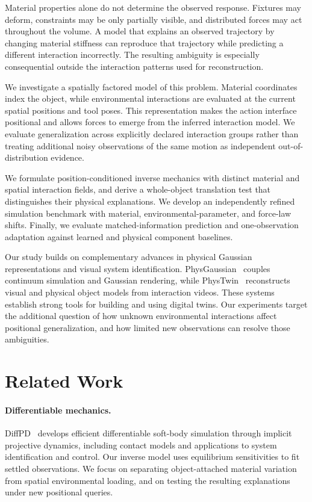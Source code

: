\documentclass[10pt,twocolumn,letterpaper]{article}
\begin{document}
Material properties alone do not determine the observed response. Fixtures may deform, constraints may be only partially visible, and distributed forces may act throughout the volume. A model that explains an observed trajectory by changing material stiffness can reproduce that trajectory while predicting a different interaction incorrectly. The resulting ambiguity is especially consequential outside the interaction patterns used for reconstruction.

We investigate a spatially factored model of this problem. Material coordinates index the object, while environmental interactions are evaluated at the current spatial positions and tool poses. This representation makes the action interface positional and allows forces to emerge from the inferred interaction model. We evaluate generalization across explicitly declared interaction groups rather than treating additional noisy observations of the same motion as independent out-of-distribution evidence.

We formulate position-conditioned inverse mechanics with distinct material and spatial interaction fields, and derive a whole-object translation test that distinguishes their physical explanations. We develop an independently refined simulation benchmark with material, environmental-parameter, and force-law shifts. Finally, we evaluate matched-information prediction and one-observation adaptation against learned and physical component baselines.

Our study builds on complementary advances in physical Gaussian representations and visual system identification. PhysGaussian~\cite{xie2024physgaussian} couples continuum simulation and Gaussian rendering, while PhysTwin~\cite{jiang2025phystwin} reconstructs visual and physical object models from interaction videos. These systems establish strong tools for building and using digital twins. Our experiments target the additional question of how unknown environmental interactions affect positional generalization, and how limited new observations can resolve those ambiguities.

\section{Related Work}
\paragraph{Differentiable mechanics.}
DiffPD~\cite{du2022diffpd} develops efficient differentiable soft-body simulation through implicit projective dynamics, including contact models and applications to system identification and control. Our inverse model uses equilibrium sensitivities to fit settled observations. We focus on separating object-attached material variation from spatial environmental loading, and on testing the resulting explanations under new positional queries.
\end{document}
